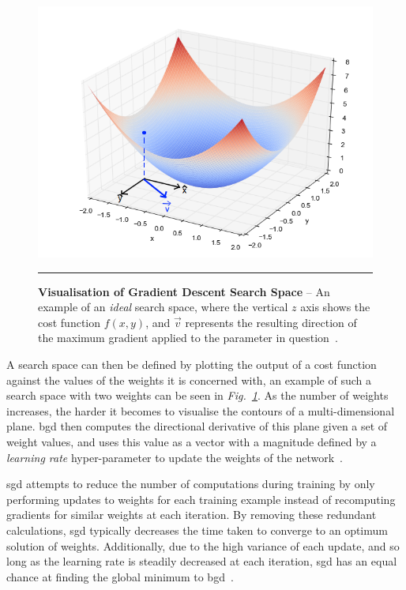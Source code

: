\begin{figure}[H]
\includegraphics[width=1\textwidth]{media/literature/gd-example.png}
    \rule{35em}{0.5pt}
    \caption[Example visualisation of gradient descent]{\textbf{Visualisation of Gradient Descent Search Space} -- An example of an \textit{ideal} search space, where the vertical $z$ axis shows the cost function $f(x, y)$, and $\vec{v}$ represents the resulting direction of the maximum gradient applied to the parameter in question~\citep{bendersky2016}.}\label{fig:gd-example}
\end{figure}

A search space can then be defined by plotting the output of a cost function against the values of the weights
it is concerned with, an example of such a search space with two weights can be seen in \textit{Fig.~\ref{fig:gd-example}}.
As the number of weights increases, the harder it becomes to visualise the contours of a multi-dimensional plane. 
\gls{bgd} then computes the directional derivative of this plane given a set of weight values, and uses this value
as a vector with a magnitude defined by a \textit{learning rate} hyper-parameter to update the weights of the network~\citep{ruder2017}.

\gls{sgd} attempts to reduce the number of 
computations during training by only performing updates
to weights for each training example instead of recomputing gradients for similar weights
at each iteration. By removing these redundant calculations, \gls{sgd} typically decreases the time taken
to converge to an optimum solution of weights. Additionally, due to the high variance of
each update, and so long as the learning rate is steadily decreased at each iteration, \gls{sgd} has an equal
chance at finding the global minimum to \gls{bgd}~\citep{ruder2017}.

